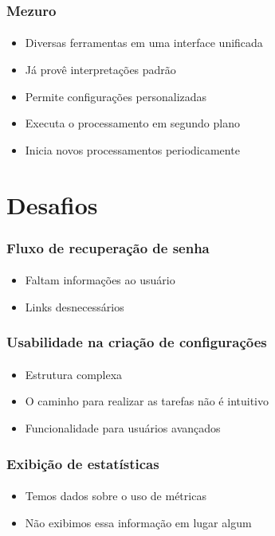 \documentclass{beamer}
\begin{document}
\begin{frame}
  \frametitle{Mezuro}
  \framesubtitle{}

  \begin{itemize}
    \item Diversas ferramentas em uma interface unificada
      \vspace{.25cm}
    \item Já provê interpretações padrão
      \vspace{.25cm}
    \item Permite configurações personalizadas
      \vspace{.25cm}
    \item Executa o processamento em segundo plano
      \vspace{.25cm}
    \item Inicia novos processamentos periodicamente
  \end{itemize}
\end{frame}

\section{Desafios}
\begin{frame}
  \frametitle{Fluxo de recuperação de senha}
  \framesubtitle{}

  \begin{itemize}
    \item Faltam informações ao usuário
      \vspace{.5cm}
    \item Links desnecessários
  \end{itemize}
\end{frame}

\begin{frame}
  \frametitle{Usabilidade na criação de configurações}
  \framesubtitle{}

  \begin{itemize}
    \item Estrutura complexa
      \vspace{.5cm}
    \item O caminho para realizar as tarefas não é intuitivo
      \vspace{.5cm}
    \item Funcionalidade para usuários avançados
  \end{itemize}
\end{frame}

\begin{frame}
  \frametitle{Exibição de estatísticas}
  \framesubtitle{}

  \begin{itemize}
    \item Temos dados sobre o uso de métricas
      \vspace{.5cm}
    \item Não exibimos essa informação em lugar algum
  \end{itemize}
\end{frame}
\end{document}
